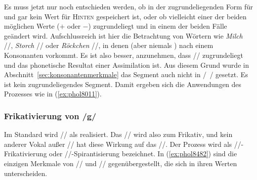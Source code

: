 
Es muss jetzt nur noch entschieden werden, ob in der zugrundeliegenden Form für \textipa{[\c{c}]} und \textipa{[X]} gar kein Wert für \textsc{Hinten} gespeichert ist, oder ob vielleicht einer der beiden möglichen Werte ($+$ oder $-$) zugrundeliegt und in einem der beiden Fälle geändert wird.
Aufschlussreich ist hier die Betrachtung von Wörtern wie \textit{Milch} //, \textit{Storch} // oder \textit{Röckchen} //, in denen \textipa{[\c{c}]} (aber niemals \textipa{[X]}) nach einem Konsonanten vorkommt.
Es ist also besser, anzunehmen, dass // zugrundeliegt und \textipa{[X]} das phonetische Resultat einer Assimilation ist.
Aus diesem Grund wurde in Abschnitt~\ref{sec:konsonantenmerkmale} das Segment \textipa{[X]} auch nicht in /~/ gesetzt.
Es ist kein zugrundeliegendes Segment.
Damit ergeben sich die Anwendungen des Prozesses wie in (\ref{ex:phol8011}).

\begin{exe}
  \ex\label{ex:phol8011}
  \begin{xlist}
  \end{xlist}
\end{exe}

\subsubsection{Frikativierung von /g/}

\label{sec:prozgfrik}

Im Standard wird // als \textipa{[I\c{c}.]} realisiert.
Das // wird also zum Frikativ, und kein anderer Vokal außer // hat diese Wirkung auf das //.
Der Prozess wird als //-Frikativierung oder //-Spirantisierung bezeichnet.
In (\ref{ex:phol8482}) sind die einzigen Merkmale von // und // gegenübergestellt, die sich in ihren Werten unterscheiden.

\begin{exe}
  \ex\label{ex:phol8482}
  \begin{xlist}
  \end{xlist}
\end{exe}

